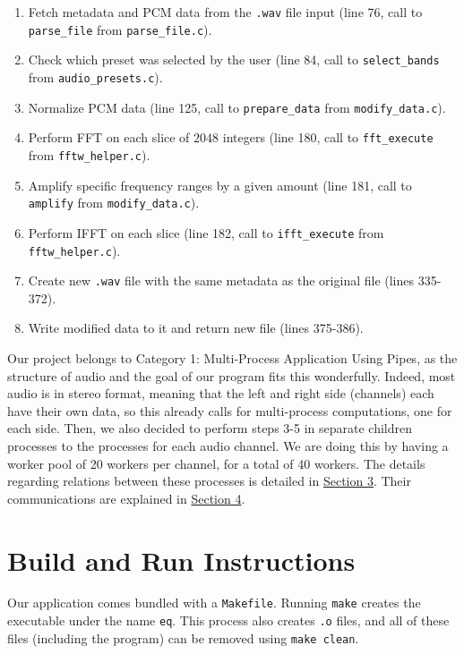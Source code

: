 \documentclass[11pt]{extarticle}
\begin{document}
\begin{enumerate}
    \item Fetch metadata and PCM data from the \texttt{.wav} file input (line 76, call to \texttt{parse\_file} from \texttt{parse\_file.c}).
    \item Check which preset was selected by the user (line 84, call to \texttt{select\_bands} from \texttt{audio\_presets.c}).
    \item Normalize PCM data (line 125, call to \texttt{prepare\_data} from \texttt{modify\_data.c}).
    \item Perform FFT on each slice of $2048$ integers (line 180, call to \texttt{fft\_execute} from \texttt{fftw\_helper.c}).
    \item Amplify specific frequency ranges by a given amount (line 181, call to \texttt{amplify} from \texttt{modify\_data.c}).
    \item Perform IFFT on each slice (line 182, call to \texttt{ifft\_execute} from \texttt{fftw\_helper.c}).
    \item Create new \texttt{.wav} file with the same metadata as the original file (lines 335-372).
    \item Write modified data to it and return new file (lines 375-386).
\end{enumerate}

Our project belongs to Category 1: Multi-Process Application Using Pipes, as the structure of audio and the goal of our program fits this wonderfully. Indeed, most audio is in stereo format, meaning that the left and right side (channels) each have their own data, so this already calls for multi-process computations, one for each side. Then, we also decided to perform steps 3-5 in separate children processes to the processes for each audio channel. We are doing this by having a worker pool of 20 workers per channel, for a total of 40 workers. The details regarding relations between these processes is detailed in \hyperref[arch]{Section 3}. Their communications are explained in \hyperref[comm]{Section 4}.

\section{Build and Run Instructions}\label{build}
Our application comes bundled with a \texttt{Makefile}. Running \texttt{make} creates the executable under the name \texttt{eq}. This process also creates \texttt{.o} files, and all of these files (including the program) can be removed using \texttt{make clean}.\\
\end{document}
